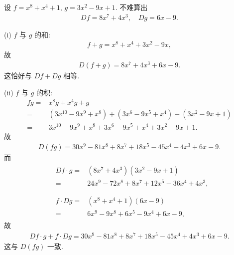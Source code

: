 \begin{example}
    设 $f = x^8 + x^4 + 1$, $g = 3x^2 - 9x + 1$. 不难算出
    \begin{align*}
        Df = 8x^7 + 4x^3, \quad Dg = 6x - 9.
    \end{align*}

    (i) $f$ 与 $g$ 的和:
    \begin{align*}
        f + g = x^8 + x^4 + 3x^2 - 9x,
    \end{align*}
    故
    \begin{align*}
        D(f + g) = 8x^7 + 4x^3 + 6x - 9.
    \end{align*}
    这恰好与 $Df + Dg$ 相等.

    (ii) $f$ 与 $g$ 的积:
    \begin{align*}
        fg
        = {} & x^8 g + x^4 g + g                                            \\
        = {} & (3x^10 - 9x^9 + x^8) + (3x^6 - 9x^5 + x^4) + (3x^2 - 9x + 1) \\
        = {} & 3x^10 - 9x^9 + x^8 + 3x^6 - 9x^5 + x^4 + 3x^2 - 9x + 1.
    \end{align*}
    故
    \begin{align*}
        D(fg) = 30x^9 - 81x^8 + 8x^7 + 18x^5 - 45x^4 + 4x^3 + 6x - 9.
    \end{align*}
    而
    \begin{align*}
         & \begin{aligned}
            Df \cdot g
            = {} & (8x^7 + 4x^3) (3x^2 - 9x + 1)            \\
            = {} & 24 x^9-72 x^8+8 x^7+12 x^5-36 x^4+4 x^3, \\
        \end{aligned}  \\
         & \begin{aligned}
            f \cdot Dg
            = {} & (x^8 + x^4 + 1) (6x - 9)       \\
            = {} & 6 x^9-9 x^8+6 x^5-9 x^4+6 x-9,
        \end{aligned}
    \end{align*}
    故
    \begin{align*}
        Df \cdot g + f \cdot Dg = 30 x^9-81 x^8+8 x^7+18 x^5-45 x^4+4 x^3+6 x-9.
    \end{align*}
    这与 $D(fg)$ 一致.


\end{example}
